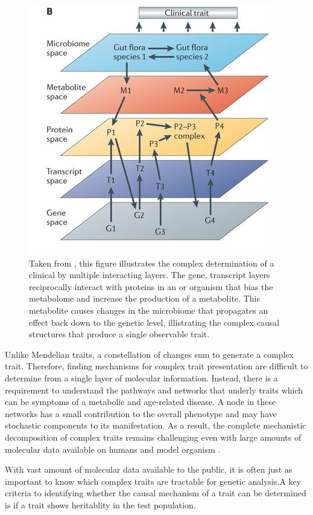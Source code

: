 \documentclass[a4paper,11pt,twoside]{book}
\begin{document}
	\begin{figure}[htb]
		\centering
		\includegraphics[width=0.6\linewidth]{1.Introduction_Figures/nrg3575-f1.jpg}
		\caption{Taken from \citeauthor{Civelek2014SystemsTraits}, this figure illustrates the complex determination of a clinical by multiple interacting layers. The gene, transcript layers reciprocally interact with proteins in an or organism that bias the metabolome and increase the production of a metabolite. This metabolite causes changes in the microbiome that propagates an effect back down to the genetic level, illistrating the complex causal structures that produce a single observable trait.}
		\label{Multi-Layer Trait Determination}
	\end{figure}
	
    Unlike Mendelian traits, a constellation of changes sum to generate a complex trait. Therefore, finding mechanisms for complex trait presentation are difficult to determine from a single layer of molecular information. Instead, there is a requirement to understand the pathways and networks that underly traits which can be symptoms of a metabolic and age-related disease. A node in these networks has a small contribution to the overall phenotype and may have stochastic components to its manifestation. As a result, the complete mechanistic decomposition of complex traits remains challenging even with large amounts of molecular data available on humans and model organism \citep{Civelek2014SystemsTraits}. 
	
	With vast amount of molecular data available to the public, it is often just as important to know which complex traits are tractable for genetic analysis.A key criteria to identifying whether the causal mechanism of a trait can be determined is if a trait shows heritablity in the test population.
	
\end{document}
